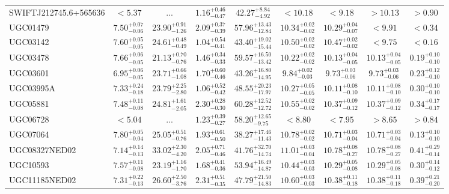 \documentclass[onecolumn]{mn2e}
\begin{document}
{\begin{center}
\begin{longtable}{lcccccccc}
SWIFTJ212745.6+565636 & $<5.37$ & ... & $1.16_{-0.47}^{+0.46}$ &$42.27_{-4.92}^{+8.84}$ & $<10.18$ & $<9.18$ & $>10.13$ & $>0.90$ \\
UGC01479 & $7.50_{-0.06}^{+0.07}$ & $23.90_{-1.26}^{+0.91}$ & $2.09_{-0.39}^{+0.37}$ &$57.96_{-12.84}^{+13.43}$ & $10.34_{-0.02}^{+0.02}$ & $10.29_{-0.07}^{+0.04}$ & $<9.91$ & $<0.34$ \\
UGC03142 & $7.60_{-0.05}^{+0.05}$ & $24.61_{-0.49}^{+0.48}$ & $1.04_{-0.41}^{+0.54}$ &$43.40_{-15.44}^{+19.02}$ & $10.50_{-0.02}^{+0.02}$ & $10.47_{-0.02}^{+0.02}$ & $<9.75$ & $<0.16$ \\
UGC03478 & $7.66_{-0.05}^{+0.06}$ & $21.13_{-0.76}^{+0.70}$ & $1.46_{-0.33}^{+0.34}$ &$59.57_{-13.42}^{+16.50}$ & $10.22_{-0.02}^{+0.02}$ & $10.13_{-0.05}^{+0.04}$ & $10.13_{-0.05}^{+0.04}$ & $0.19_{-0.10}^{+0.10}$ \\
UGC03601 & $6.95_{-0.05}^{+0.06}$ & $23.71_{-1.08}^{+0.66}$ & $1.70_{-0.46}^{+0.60}$ &$43.26_{-14.95}^{+16.80}$ & $9.84_{-0.03}^{+0.02}$ & $9.73_{-0.06}^{+0.03}$ & $9.73_{-0.06}^{+0.03}$ & $0.23_{-0.10}^{+0.12}$ \\
UGC03995A & $7.33_{-0.18}^{+0.24}$ & $23.79_{-2.80}^{+2.25}$ & $1.06_{-0.42}^{+0.52}$ &$48.55_{-17.97}^{+20.23}$ & $10.27_{-0.05}^{+0.05}$ & $10.11_{-0.10}^{+0.08}$ & $10.11_{-0.10}^{+0.08}$ & $0.30_{-0.10}^{+0.10}$ \\
UGC05881 & $7.48_{-0.08}^{+0.11}$ & $24.81_{-2.05}^{+1.61}$ & $2.30_{-0.30}^{+0.28}$ &$60.28_{-12.72}^{+12.52}$ & $10.55_{-0.02}^{+0.02}$ & $10.37_{-0.12}^{+0.09}$ & $10.37_{-0.12}^{+0.09}$ & $0.34_{-0.17}^{+0.17}$ \\
UGC06728 & $<5.04$ & ... & $1.23_{-0.27}^{+0.39}$ &$58.20_{-9.75}^{+12.65}$ & $<8.80$ & $<7.95$ & $>8.65$ & $>0.84$ \\
UGC07064 & $7.80_{-0.04}^{+0.05}$ & $25.05_{-0.76}^{+0.51}$ & $1.93_{-0.50}^{+0.61}$ &$38.27_{-11.43}^{+17.46}$ & $10.78_{-0.02}^{+0.02}$ & $10.71_{-0.04}^{+0.03}$ & $10.71_{-0.04}^{+0.03}$ & $0.13_{-0.10}^{+0.10}$ \\
UGC08327NED02 & $7.14_{-0.13}^{+0.14}$ & $33.02_{-4.20}^{+2.30}$ & $2.05_{-0.46}^{+0.71}$ &$41.76_{-14.74}^{+32.70}$ & $11.01_{-0.04}^{+0.03}$ & $10.78_{-0.27}^{+0.08}$ & $10.78_{-0.27}^{+0.08}$ & $0.41_{-0.14}^{+0.29}$ \\
UGC10593 & $7.57_{-0.08}^{+0.11}$ & $23.19_{-1.70}^{+1.16}$ & $1.68_{-0.36}^{+0.41}$ &$53.94_{-14.87}^{+16.49}$ & $10.44_{-0.03}^{+0.03}$ & $10.29_{-0.08}^{+0.05}$ & $10.29_{-0.08}^{+0.05}$ & $0.30_{-0.12}^{+0.14}$ \\
UGC11185NED02 & $7.31_{-0.13}^{+0.22}$ & $26.60_{-3.76}^{+2.50}$ & $2.31_{-0.35}^{+0.51}$ &$47.79_{-14.83}^{+21.50}$ & $10.60_{-0.03}^{+0.03}$ & $10.38_{-0.18}^{+0.11}$ & $10.38_{-0.18}^{+0.11}$ & $0.39_{-0.20}^{+0.21}$ \\

\end{longtable}
\end{center}}
\end{document}
